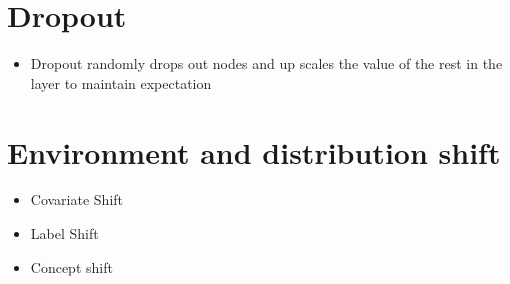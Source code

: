 \documentclass[12pt,notitlepage]{article}
\begin{document}
\section{Dropout}
\begin{itemize}
    \item Dropout randomly drops out nodes and up scales the value of the rest in the layer to maintain expectation
\end{itemize}

\section{Environment and distribution shift}
\begin{itemize}
    \item Covariate Shift
    \item Label Shift
    \item Concept shift
\end{itemize}

\vfill

\nocite{zhang2020dive}
\end{document}
